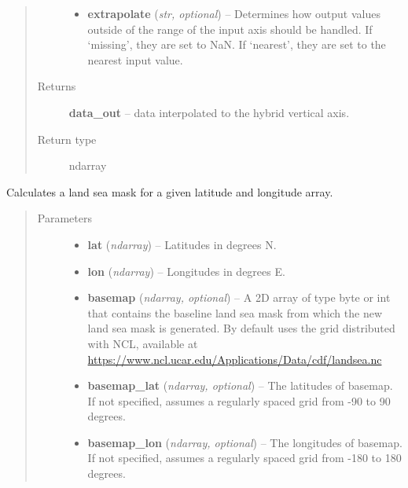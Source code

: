 \documentclass[letterpaper,10pt,english]{sphinxmanual}
\begin{document}
\begin{fulllineitems}
\begin{quote}
\begin{description}
\begin{itemize}
\item {} 
\textbf{extrapolate} (\emph{str, optional}) -- Determines how output values outside of the range of the input axis
should be handled. If `missing', they are set to NaN. If `nearest',
they are set to the nearest input value.

\end{itemize}

\item[{Returns}] \leavevmode
\textbf{data\_out} --
data interpolated to the hybrid vertical axis.

\item[{Return type}] \leavevmode
ndarray

\end{description}\end{quote}

\end{fulllineitems}


\begin{fulllineitems}
\label{atmos:atmos.util.landsea_mask}
Calculates a land sea mask for a given latitude and longitude array.
\begin{quote}\begin{description}
\item[{Parameters}] \leavevmode\begin{itemize}
\item {} 
\textbf{lat} (\emph{ndarray}) -- Latitudes in degrees N.

\item {} 
\textbf{lon} (\emph{ndarray}) -- Longitudes in degrees E.

\item {} 
\textbf{basemap} (\emph{ndarray, optional}) -- A 2D array of type byte or int that contains the baseline land sea
mask from which the new land sea mask is generated. By default uses
the grid distributed with NCL, available at
\href{https://www.ncl.ucar.edu/Applications/Data/cdf/landsea.nc}{https://www.ncl.ucar.edu/Applications/Data/cdf/landsea.nc}

\item {} 
\textbf{basemap\_lat} (\emph{ndarray, optional}) -- The latitudes of basemap. If not specified, assumes a regularly spaced
grid from -90 to 90 degrees.

\item {} 
\textbf{basemap\_lon} (\emph{ndarray, optional}) -- The longitudes of basemap. If not specified, assumes a regularly spaced
grid from -180 to 180 degrees.

\end{itemize}

\end{description}\end{quote}

\end{fulllineitems}
\end{document}
